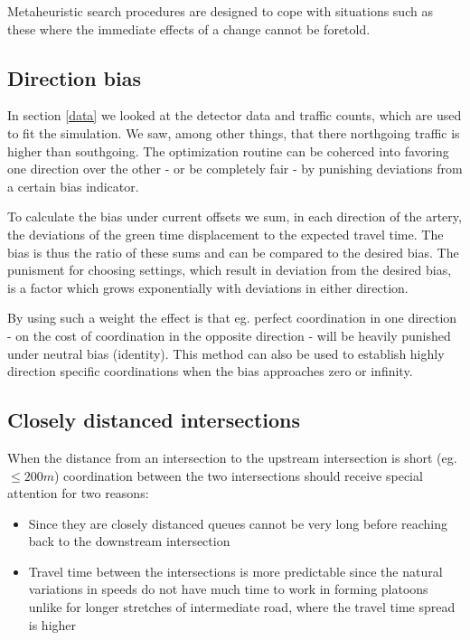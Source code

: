 Metaheuristic search procedures are designed to cope with situations such as these where the immediate effects of a change cannot be foretold.

\subsection{Direction bias}
In section \ref{data} we looked at the detector data and traffic counts, which are used to fit the simulation. We saw, among other things, that there northgoing traffic is higher than southgoing. The optimization routine can be coherced into favoring one direction over the other - or be completely fair - by punishing deviations from a certain bias indicator.

To calculate the bias under current offsets we sum, in each direction of the artery, the deviations of the green time displacement to the expected travel time. The bias is thus the ratio of these sums and can be compared to the desired bias. The punisment for choosing settings, which result in deviation from the desired bias, is a factor which grows exponentially with deviations in either direction.

By using such a weight the effect is that eg. perfect coordination in one direction - on the cost of coordination in the opposite direction - will be heavily punished under neutral bias (identity). This method can also be used to establish highly direction specific coordinations when the bias approaches zero or infinity.

\subsection{Closely distanced intersections}
When the distance from an intersection to the upstream intersection is short (eg. $\leq 200 m$) coordination between the two intersections should receive special attention for two reasons:

\begin{itemize}
\item Since they are closely distanced queues cannot be very long before reaching back to the downstream intersection
\item Travel time between the intersections is more predictable since the natural variations in speeds do not have much time to work in forming platoons unlike for longer stretches of intermediate road, where the travel time spread is higher
\end{itemize}

